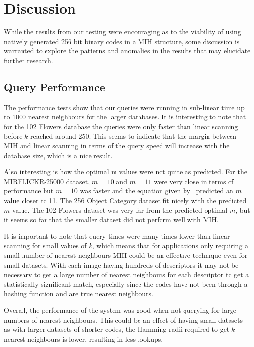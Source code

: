 \chapter{Discussion}
While the results from our testing were encouraging as to the viability of using natively generated 256 bit binary codes in a MIH structure, some discussion is warranted to explore the patterns and anomalies in the results that may elucidate further research.

\section{Query Performance}
The performance tests show that our queries were running in sub-linear time up to 1000 nearest neighbours for the larger databases. It is interesting to note that for the 102 Flowers database the queries were only faster than linear scanning before $k$ reached around 250. This seems to indicate that the margin between MIH and linear scanning in terms of the query speed will increase with the database size, which is a nice result.

Also interesting is how the optimal m values were not quite as predicted. For the MIRFLICKR-25000 dataset, $m=10$ and $m=11$ were very close in terms of performance but $m=10$ was faster and the equation given by~\cite{norouzi2012fast} predicted an $m$ value closer to 11. The 256 Object Category dataset fit nicely with the predicted $m$ value. The 102 Flowers dataset was very far from the predicted optimal $m$, but it seems so far that the smaller dataset did not perform well with MIH.

It is important to note that query times were many times lower than linear scanning for small values of $k$, which means that for applications only requiring a small number of nearest neighbours MIH could be an effective technique even for small datasets. With each image having hundreds of descriptors it may not be necessary to get a large number of nearest neighbours for each descriptor to get a statistically significant match, especially since the codes have not been through a hashing function and are true nearest neighbours.

Overall, the performance of the system was good when not querying for large numbers of nearest neighbours. This could be an effect of having small datasets as with larger datasets of shorter codes, the Hamming radii required to get $k$ nearest neighbours is lower, resulting in less lookups.

